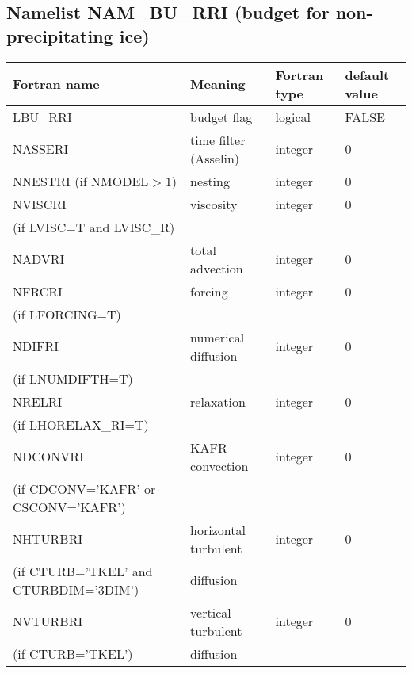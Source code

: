 \subsection{Namelist NAM\_BU\_RRI (budget for non-precipitating ice)}
\begin{longtable} {|p{}|p{}|>{\centering}p{}|p{}<{\centering}|}
\hline
Fortran name & Meaning & Fortran type & default value \\
\hline \hline
\endhead
LBU\_RRI & budget flag & logical & FALSE\index{LBU\_RRI!\innam{NAM\_BU\_RRI}} \\\hline
NASSERI  & time filter (Asselin)   & integer  &  0 \index{NASSERI!\innam{NAM\_BU\_RRI}} \\\hline
NNESTRI (if NMODEL$>1$) & nesting           & integer  &  0 \index{NNESTRI!\innam{NAM\_BU\_RRI}} \\\hline
NVISCRI  & viscosity         & integer  &  0 \index{NVISCRI!\innam{NAM\_BU\_RRI}}\\
(if LVISC=T and LVISC\_R) &  &   &   \\\hline
NADVRI   & total advection   & integer  &  0 \index{NADVRI!\innam{NAM\_BU\_RRI}}\\\hline
NFRCRI   & forcing           & integer  &  0 \index{NFRCRI!\innam{NAM\_BU\_RRI}} \\ \nopagebreak
(if LFORCING=T) &  &   &   \\\hline
NDIFRI   & numerical diffusion & integer  &  0 \index{NDIFRI!\innam{NAM\_BU\_RRI}} \\ \nopagebreak
(if LNUMDIFTH=T) &  &   &   \\\hline
NRELRI   & relaxation        & integer  &  0 \index{NRELRI!\innam{NAM\_BU\_RRI}}\\ \nopagebreak
(if LHORELAX\_RI=T) &  &   &   \\\hline
NDCONVRI & KAFR convection   & integer  &  0 \index{NDCONVRI!\innam{NAM\_BU\_RRI}} \\ \nopagebreak
(if CDCONV='KAFR' or CSCONV='KAFR') &  &   &   \\\hline
NHTURBRI & horizontal turbulent  & integer  &  0 \index{NHTURBRI!\innam{NAM\_BU\_RRI}}\\ \nopagebreak
(if CTURB='TKEL' and CTURBDIM='3DIM') &diffusion &   &  \\\hline
NVTURBRI & vertical turbulent  & integer  &  0 \index{NVTURBRI!\innam{NAM\_BU\_RRI}}\\ \nopagebreak
(if CTURB='TKEL') &diffusion &   &  \\\hline

\end{longtable}
